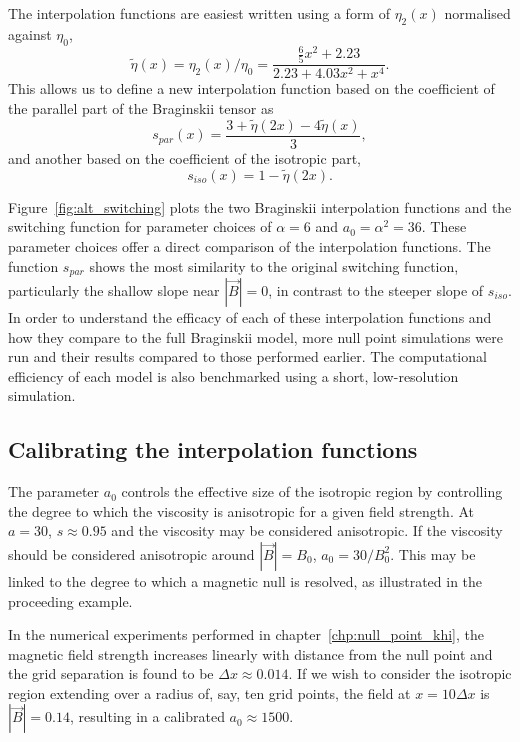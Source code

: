 The interpolation functions are easiest written using a form of $\eta_2(x)$ normalised against $\eta_0$,
\begin{equation}
  \label{eq:eta_function}
  \tilde{\eta}(x) = \eta_2(x)/\eta_0 = \frac{\tfrac{6}{5}x^2 + 2.23}{2.23 + 4.03 x^2 + x^4}.
\end{equation}
This allows us to define a new interpolation function based on the coefficient of the parallel part of the Braginskii tensor as
\begin{equation}
  \label{eq:alt_switching1}
s_{par}(x) = \frac{3+\tilde{\eta}(2x)-4\tilde{\eta}(x)}{3},
\end{equation}
and another based on the coefficient of the isotropic part,
\begin{equation}
  \label{eq:alt_switching2}
s_{iso}(x) = 1 - \tilde{\eta}(2x).
\end{equation}

Figure~\ref{fig:alt_switching} plots the two Braginskii interpolation functions and the switching function for parameter choices of $\alpha = 6$ and $a_0 = \alpha^2 = 36$. These parameter choices offer a direct comparison of the interpolation functions. The function $s_{par}$ shows the most similarity to the original switching function, particularly the shallow slope near $|\vec{B}| = 0$, in contrast to the steeper slope of $s_{iso}$. In order to understand the efficacy of each of these interpolation functions and how they compare to the full Braginskii model, more null point simulations were run and their results compared to those performed earlier. The computational efficiency of each model is also benchmarked using a short, low-resolution simulation.


\subsection{Calibrating the interpolation functions}

The parameter $a_0$ controls the effective size of the isotropic region by controlling the degree to which the viscosity is anisotropic for a given field strength. At $a = 30$, $s \approx 0.95$ and the viscosity may be considered anisotropic. If the viscosity should be considered anisotropic around $|\vec{B}| = B_0$, $a_0 = 30/B_0^2$. This may be linked to the degree to which a magnetic null is resolved, as illustrated in the proceeding example. 

In the numerical experiments performed in chapter~\ref{chp:null_point_khi}, the magnetic field strength increases linearly with distance from the null point and the grid separation is found to be $\Delta x \approx 0.014$. If we wish to consider the isotropic region extending over a radius of, say, ten grid points, the field at $x = 10 \Delta x$ is $|\vec{B}| = 0.14$, resulting in a calibrated $a_0 \approx 1500$. 


